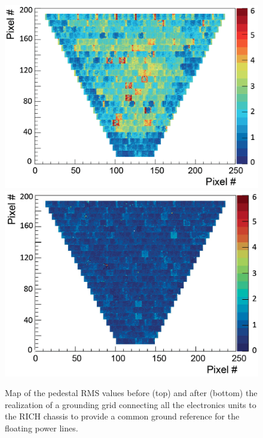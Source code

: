 \documentclass[5p,times,twocolumn]{elsarticle}
\begin{document}
\begin{figure}[t]
\begin{center}
\includegraphics[width=1.0\columnwidth]{pedestal_rms_before.png}
\includegraphics[width=1.0\columnwidth]{pedestal_rms_after.png}
\end{center}
\caption{Map of the pedestal RMS values before (top) and after (bottom) the realization of a grounding grid
  connecting all the electronics units to the RICH chassis to provide a common ground reference for the floating
  power lines.}
\label{fig:GroundG}
\end{figure}
\end{document}
